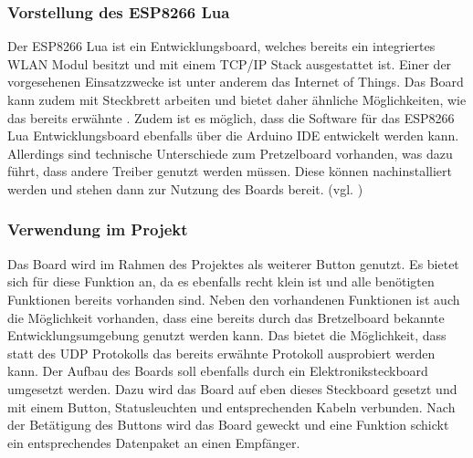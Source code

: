 \subsubsection{Vorstellung des ESP8266 Lua}        
\label{sec:Vorstellung des ESP8266} 

Der ESP8266 Lua ist ein Entwicklungsboard, welches bereits ein integriertes WLAN Modul besitzt und mit einem TCP/IP Stack ausgestattet ist. Einer der vorgesehenen Einsatzzwecke ist unter anderem das Internet of Things. Das Board kann zudem mit Steckbrett arbeiten und bietet daher ähnliche Möglichkeiten, wie das bereits erwähnte . Zudem ist es möglich, dass die Software für das ESP8266 Lua Entwicklungsboard ebenfalls über die Arduino IDE entwickelt werden kann. Allerdings sind technische Unterschiede zum Pretzelboard vorhanden, was dazu führt, dass andere Treiber genutzt werden müssen. 
Diese können nachinstalliert werden und stehen dann zur Nutzung des Boards bereit. (vgl. \cite{Carius.15.01.2017}\cite{.d})

\subsubsection{Verwendung im Projekt}        
\label{sec:Verwendung des ESP8266} 
Das Board wird im Rahmen des Projektes als weiterer Button genutzt. Es bietet sich für diese Funktion an, da es ebenfalls recht klein ist und alle benötigten Funktionen bereits vorhanden sind. Neben den vorhandenen Funktionen ist auch die Möglichkeit vorhanden, dass eine bereits durch das Bretzelboard bekannte Entwicklungsumgebung genutzt werden kann. Das bietet die Möglichkeit, dass statt des UDP Protokolls das bereits erwähnte  Protokoll ausprobiert werden kann. 
Der Aufbau des Boards soll ebenfalls durch ein Elektroniksteckboard umgesetzt werden. Dazu wird das Board auf eben dieses Steckboard gesetzt und mit einem Button, Statusleuchten und entsprechenden Kabeln verbunden. Nach der Betätigung des Buttons wird das Board geweckt und eine Funktion schickt ein entsprechendes Datenpaket an einen Empfänger.
\newpage
